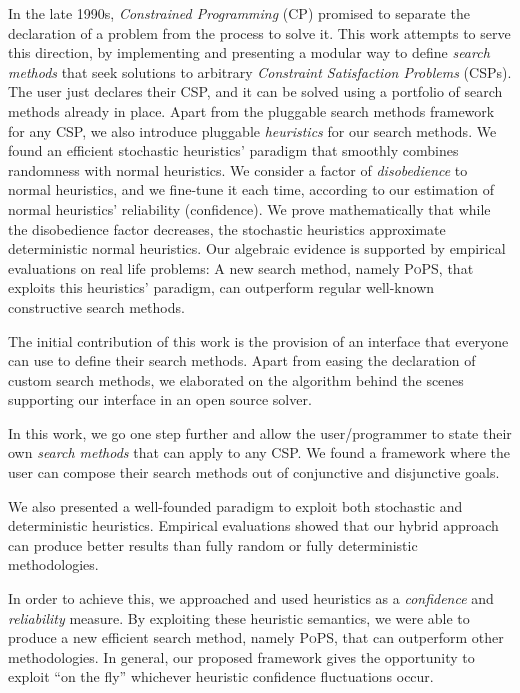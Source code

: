 \documentclass[a4paper]{article}
\begin{document}
In the late 1990s, \emph{Constrained Programming} (CP)
promised to separate the declaration of a problem from the
process to solve it. This work attempts to serve this
direction, by implementing and presenting a modular way to
define \emph{search methods} that seek solutions to
arbitrary \emph{Constraint Satisfaction Problems} (CSPs).
The user just declares their CSP, and it can be solved using
a portfolio of search methods already in place. Apart from
the pluggable search methods framework for any CSP, we also
introduce pluggable \emph{heuristics} for our search
methods. We found an efficient stochastic heuristics'
paradigm that smoothly combines randomness with normal
heuristics. We consider a factor of \emph{disobedience} to
normal heuristics, and we fine-tune it each time, according
to our estimation of normal heuristics' reliability
(confidence). We prove mathematically that while the
disobedience factor decreases, the stochastic heuristics
approximate deterministic normal heuristics. Our algebraic
evidence is supported by empirical evaluations on real life
problems: A new search method, namely \textsc{PoPS}, that
exploits this heuristics' paradigm, can outperform regular
well-known constructive search methods.

The initial contribution of this work is the provision of an
interface that everyone can use to define their search
methods. Apart from easing the declaration of custom search
methods, we elaborated on the algorithm behind the scenes
supporting our interface in an open source solver.

In this work, we go one step further and allow the
user\slash programmer to state their own \emph{search
methods} that can apply to any CSP. We found a framework
where the user can compose their search methods out of
conjunctive and disjunctive goals.

We also presented a well-founded paradigm to exploit both
stochastic and deterministic heuristics. Empirical
evaluations showed that our hybrid approach can produce
better results than fully random or fully deterministic
methodologies.

In order to achieve this, we approached and used heuristics
as a \emph{confidence} and \emph{reliability} measure. By
exploiting these heuristic semantics, we were able to
produce a new efficient search method, namely \textsc{PoPS},
that can outperform other methodologies. In general, our
proposed framework gives the opportunity to exploit ``on the
fly'' whichever heuristic confidence fluctuations occur.
\end{document}
